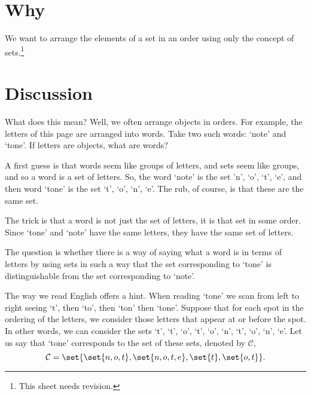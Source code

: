 

\section*{Why}

We want to arrange the elements of a set in an order using only the concept of sets.\footnote{This sheet needs revision.}

\section*{Discussion}

What does this mean? Well, we often arrange objects in orders.
For example, the letters of this page are arranged into words.
Take two such words: `note' and `tone'.
If letters are objects, what are words?

A first guess is that words seem like groups of letters, and sets seem like groups, and so a word is a set of letters.
So, the word `note' is the set {'n', `o', `t', `e'}, and then word `tone' is the set {`t', `o', `n', `e'}.
The rub, of course, is that these are the same set.

The trick is that a word is not just the set of letters, it is that set in some order.
Since `tone' and `note' have the same letters, they have the same set of letters.

The question is whether there is a way of saying what a word is in terms of letters by using sets in such a way that the set corresponding to `tone' is distinguishable from the set corresponding to `note'.


The way we read English offers a hint.
When reading `tone' we scan from left to right seeing `t', then `to', then `ton' then `tone'.
Suppose that for each spot in the ordering of the letters, we consider those letters that appear at or before the spot.
In other words, we can consider the sets {`t'}, {`t', `o'}, {`t', `o', `n'}, {`t', `o', `n', `e'}.
Let us say that `tone' corresponds to the set of these sets, denoted by $\mathcal{C} $,
    \[
\mathcal{C}  = \set{\set{n, o, t}, \set{n, o, t, e}, \set{t}, \set{o, t}}.
    \]

